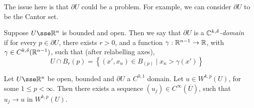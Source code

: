 \documentclass{article}
\begin{document}
The issue here is that \(\partial U\) could be a problem. For example, we can consider \(\partial U\) to be the Cantor set.

\begin{definition}
    Suppose \(U \sse \R^n\) is bounded and open. Then we say that \(\partial U\) is a \emph{\(\mathbb{C}^{k, \delta}\)-domain} if for every \(p \in \partial U\), there exists \(r > 0\), and a function \(\gamma : \mathbb{R}^{n-1} \to \mathbb{R}\), with \(\gamma \in C^{k,\delta}(\mathbb{R}^{n-1})\), such that (after relabelling axes),
    \[U \cap B_r(p) = \left\{(x', x_n) \in B_(p) \mid x_n > \gamma(x')\right\}\]
\end{definition}

\begin{theorem}
    \label{thm:smooth-approx-up-to-boundary}
    Let \(U \sse \R^n\) be open, bounded and \(\partial U\) a \(C^{0, 1}\) domain. Let \(u \in W^{k, p}(U)\), for some \(1 \le p < \infty\). Then there exists a sequence \((u_j) \in C^\infty(\overline U)\), such that \(u_j \to u\) in \(W^{k, p}(U)\).
\end{theorem}
\end{document}
